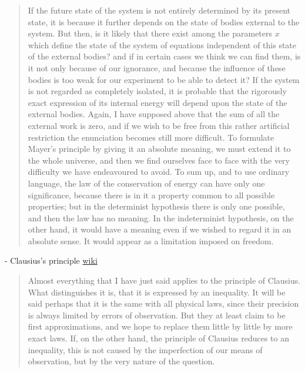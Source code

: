 \documentclass{article}
\begin{document}
 \begin{quote}
     If the future state of the system is not entirely determined by its present state, it is because it further depends on the state of bodies external to the system.  But then, is it likely that there exist among the parameters $x$ which define the state of the system of equations independent of this state of the external bodies? and if in certain cases we think we can find them, is it not only because of our ignorance, and because the influence of these bodies is too weak for our experiment to be able to detect it?  If the system is not regarded as completely isolated, it is probable that the rigorously exact expression of its internal energy will depend upon the state of the external bodies.  Again, I have supposed above that the sum of all the external work is zero, and if we wish to be free from this rather artificial restriction the enunciation becomes still more difficult.  To formulate Mayer's principle by giving it an absolute meaning, we must extend it to the whole universe, and then we find ourselves face to face with the very difficulty we have endeavoured to avoid.  To sum up, and to use ordinary language, the law of the conservation of energy can have only one significance, because there is in it a property common to all possible properties; but in the determinist hypothesis there is only one possible, and then the law has no meaning.  In the indeterminist hypothesis, on the other hand, it would have a meaning even if we wished to regard it in an absolute sense.  It would appear as a limitation imposed on freedom.  \cite[p. 133-134]{Poincare1952}
 \end{quote}
 
 - Clausius's principle \href{https://en.wikipedia.org/wiki/Clausius_theorem}{wiki}
 

 
 \begin{quote}
     Almost everything that I have just said applies to the principle of Clausius.  What distinguishes it is, that it is expressed by an inequality.  It will be said perhaps that it is the same with all physical laws, since their precision is always limited by errors of observation.  But they at least claim to be first approximations, and we hope to replace them little by little by more exact laws.  If, on the other hand, the principle of Clausius reduces to an inequality, this is not caused by the imperfection of our means of observation, but by the very nature of the question.  \citep[p. 135]{Poincare1952}
 \end{quote}
 
\end{document}
